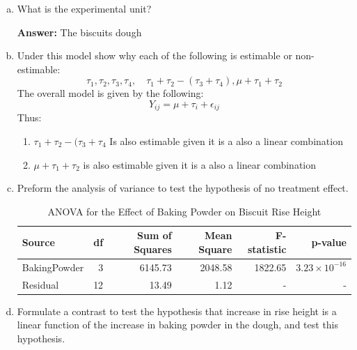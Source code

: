 \documentclass{article}
\begin{document}
\begin{enumerate}[(a)]
	\item What is the experimental unit?

	      \textbf{Answer:} The biscuits dough
	\item Under this model  show why each of the following is estimable or non-estimable:
	      $$
		      \tau_1, \tau_2, \tau_3,\tau_4, \quad \tau_1 + \tau_2 - (\tau_3 + \tau_4), \mu + \tau_1 + \tau_2
	      $$
	      The overall model is given by the following:
	      $$
		      Y_{ij} = \mu + \tau_i + \epsilon_{ij}
	      $$
	      Thus:
	      \begin{enumerate}
		      \item $\tau_1 + \tau_2 -(\tau_3 + \tau_4$ Is also estimable given it is a also a linear combination
		      \item $\mu + \tau_1 + \tau_2$ is also estimable given it is a also a linear combination
	      \end{enumerate}
	\item Preform the analysis of variance to test the hypothesis of no treatment effect.
	      \begin{table}[!ht]
		      \centering
		      \caption{ANOVA for the Effect of Baking Powder on Biscuit Rise Height}
		      \begin{tabular}{lrrrrr}
			      \hline
			      \textbf{Source} & \textbf{df} & \textbf{Sum of Squares} & \textbf{Mean Square} & \textbf{F-statistic} & \textbf{p-value}         \\
			      \hline
			      BakingPowder    & 3           & 6145.73                 & 2048.58              & 1822.65              & \(3.23 \times 10^{-16}\) \\
			      Residual        & 12          & 13.49                   & 1.12                 & -                    & -                        \\
			      \hline
		      \end{tabular}
	      \end{table}

	\item Formulate a contrast to test the hypothesis that increase in rise height is a linear function of the increase in baking powder in the dough,
	      and test this hypothesis.


\end{enumerate}
\end{document}
